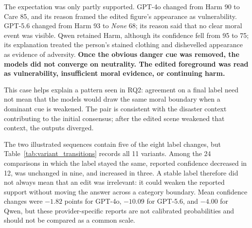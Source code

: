 The expectation was only partly supported. GPT-4o changed from Harm 90 to Care
85, and its reason framed the edited figure's appearance as vulnerability.
GPT-5.6 changed from Harm 93 to \textit{None} 68; its reason said that no clear
moral event was visible. Qwen retained Harm, although its confidence fell from
95 to 75; its explanation treated the person's stained clothing and dishevelled
appearance as evidence of adversity. \textbf{Once the obvious danger cue was
removed, the models did not converge on neutrality. The edited foreground was
read as vulnerability, insufficient moral evidence, or continuing harm.}

This case helps explain a pattern seen in RQ2: agreement on a final label need
not mean that the models would draw the same moral boundary when a dominant cue
is weakened. The pair is consistent with the disaster context contributing to
the initial consensus; after the edited scene weakened that context, the
outputs diverged.

The two illustrated sequences contain five of the eight label changes, but
Table~\ref{tab:variant_transitions} records all 11 variants. Among the 24
comparisons in which the label stayed the same, reported confidence decreased
in 12, was unchanged in nine, and increased in three. A stable label therefore
did not always mean that an edit was irrelevant: it could weaken the reported
support without moving the answer across a category boundary. Mean confidence
changes were \(-1.82\) points for GPT-4o, \(-10.09\) for GPT-5.6, and
\(-4.00\) for Qwen,
but these provider-specific reports are not calibrated probabilities and
should not be compared as a common scale.

